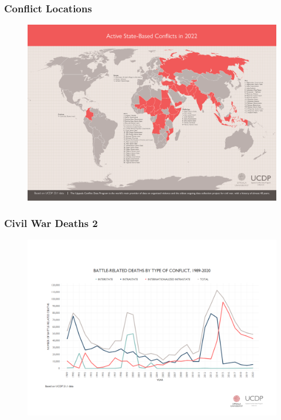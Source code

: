 \documentclass{beamer}
\begin{document}
\begin{frame} 
	\frametitle{\LARGE{Conflict Locations}}
	\begin{figure}[ht!]
		\centering
		\includegraphics[width=\textwidth,height=\textheight,keepaspectratio]{WorldWap2022SB.png}
	\end{figure}
\end{frame}

\begin{frame} 
	\frametitle{\LARGE{Civil War Deaths 2}}
	\begin{figure}[ht!]
		\centering
		\includegraphics[width=\textwidth,height=\textheight,keepaspectratio]{brd_by_toc.png}
	\end{figure}
\end{frame}
\end{document}

